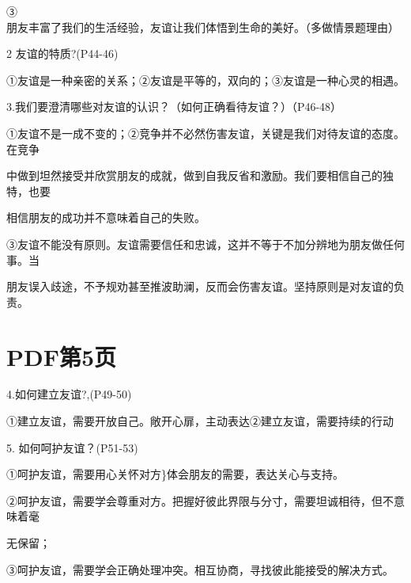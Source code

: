 \documentclass[lang=cn,11pt]{elegantbook}
\newcommand{\daofasym}[1]{{\daofasymbolfont #1}}
\newcommand{\daofasym}[1]{#1}
\begin{document}
\daofasym{③}朋友丰富了我们的生活经验，友谊让我们体悟到生命的美好。（多做情景题理由）\par

2 友谊的特质?(P44-46)\par

\daofasym{①}友谊是一种亲密的关系；\daofasym{②}友谊是平等的，双向的；\daofasym{③}友谊是一种心灵的相遇。\par

3.我们要澄清哪些对友谊的认识？（如何正确看待友谊？）（P46-48）\par

\daofasym{①}友谊不是一成不变的；\daofasym{②}竞争并不必然伤害友谊，关键是我们对待友谊的态度。在竞争\par

中做到坦然接受并欣赏朋友的成就，做到自我反省和激励。我们要相信自己的独特，也要\par

相信朋友的成功并不意味着自己的失败。\par

\daofasym{③}友谊不能没有原则。友谊需要信任和忠诚，这并不等于不加分辨地为朋友做任何事。当\par

朋友误入歧途，不予规劝甚至推波助澜，反而会伤害友谊。坚持原则是对友谊的负责。\par


\section*{PDF第5页}

4.如何建立友谊?,(P49-50)\par

\daofasym{①}建立友谊，需要开放自己。敞开心扉，主动表达\daofasym{②}建立友谊，需要持续的行动\par

5. 如何呵护友谊？(P51-53)\par

\daofasym{①}呵护友谊，需要用心关怀对方\}体会朋友的需要，表达关心与支持。\par

\daofasym{②}呵护友谊，需要学会尊重对方。把握好彼此界限与分寸，需要坦诚相待，但不意味着毫\par

无保留；\par

\daofasym{③}呵护友谊，需要学会正确处理冲突。相互协商，寻找彼此能接受的解决方式。\par
\end{document}
